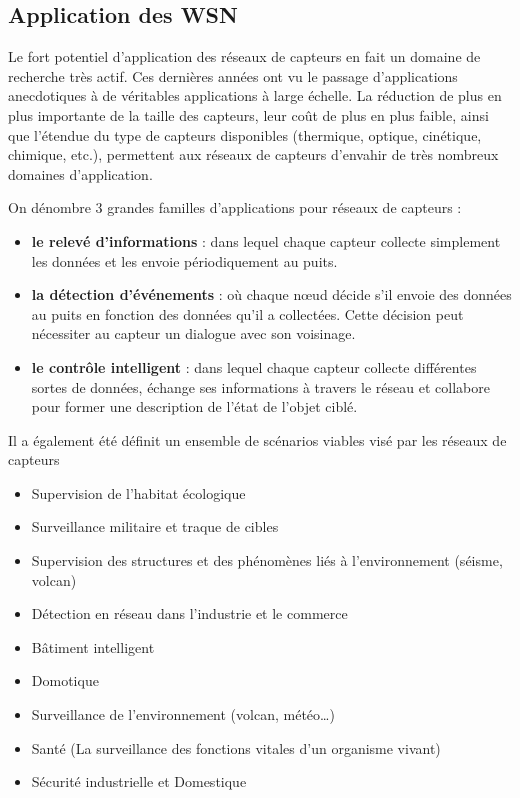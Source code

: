 \subsection{Application des WSN}
Le fort potentiel d’application des réseaux de capteurs en fait un domaine de recherche très actif. Ces dernières années ont vu le passage d’applications anecdotiques à de véritables applications à large échelle. La réduction de plus en plus importante de la taille des capteurs, leur coût de plus en plus faible, ainsi que l’étendue du type de capteurs disponibles (thermique, optique, cinétique, chimique, etc.), permettent aux réseaux de capteurs d’envahir de très nombreux domaines d’application.

On dénombre 3 grandes familles d’applications pour réseaux de capteurs :
\begin{itemize}

\item \textbf{le relevé d’informations} : dans lequel chaque capteur collecte simplement les données et les envoie périodiquement au puits.

\item \textbf{la détection d’événements} : où chaque nœud décide s’il envoie des données au puits en fonction des données qu’il a collectées. Cette décision peut nécessiter au capteur un dialogue avec son voisinage.

\item \textbf{le contrôle intelligent} : dans lequel chaque capteur collecte différentes sortes de données, échange ses informations à travers le réseau et collabore pour former une description de l’état de l’objet ciblé.

\end{itemize}

Il a également été définit un ensemble de scénarios viables visé par les réseaux de capteurs

\begin{itemize}

\item Supervision de l'habitat écologique
\item Surveillance militaire et traque de cibles
\item Supervision des structures et des phénomènes liés à l’environnement (séisme, volcan)
\item Détection en réseau dans l'industrie et le commerce
\item Bâtiment intelligent
\item Domotique
\item Surveillance de l’environnement (volcan, météo…)
\item Santé  (La surveillance des fonctions vitales d'un organisme vivant)
\item Sécurité industrielle et Domestique

\end{itemize}


